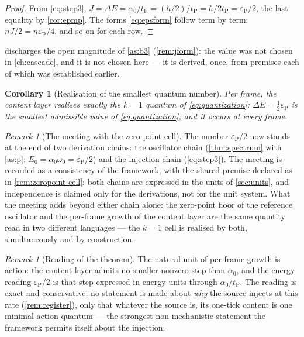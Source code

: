 \documentclass[11pt]{amsbook}
\theoremstyle{plain}
\newtheorem{corollary}[theorem]{Corollary}
\theoremstyle{definition}
\theoremstyle{remark}
\newtheorem{remark}[theorem]{Remark}
\newcommand{\uses}[1]{\par\nopagebreak\noindent{\footnotesize\emph{Uses: #1.}\par}}
\begin{document}
\begin{proof}
From \cref{eq:step3}, $J = \Delta E = \alpha_{0}/t_{\mathrm P} = (\hbar/2)/t_{\mathrm P} = \hbar/2t_{\mathrm P} = \varepsilon_{\mathrm P}/2$, the last equality by \cref{cor:epmp}. The forms \cref{eq:epsform} follow term by term: $nJ/2 = n\varepsilon_{\mathrm P}/4$, and so on for each row.
\end{proof}

 discharges the open magnitude of \cref{as:b3} (\cref{rem:jform}): the value was not chosen in \cref{ch:cascade}, and it is not chosen here --- it is derived, once, from premises each of which was established earlier.

\begin{corollary}[Realisation of the smallest quantum number]\label{cor:quantum-realized}
Per frame, the content layer realises exactly the $k = 1$ quantum of \cref{eq:quantization}: $\Delta E = \tfrac{1}{2}\varepsilon_{\mathrm P}$ is the smallest admissible value of \cref{eq:quantization}, and it occurs at every frame.
\uses{\cref{thm:injection}, \cref{as:a2}}
\end{corollary}

\begin{remark}[The meeting with the zero-point cell]\label{rem:meeting}
The number $\varepsilon_{\mathrm P}/2$ now stands at the end of two derivation chains: the oscillator chain (\cref{thm:spectrum} with \cref{as:p}: $E_{0} = \alpha_{0}\omega_{0} = \varepsilon_{\mathrm P}/2$) and the injection chain (\cref{eq:step3}). The meeting is recorded as a consistency of the framework, with the shared premise declared as in \cref{rem:zeropoint-cell}: both chains are expressed in the units of \cref{sec:units}, and independence is claimed only for the derivations, not for the unit system. What the meeting adds beyond either chain alone: the zero-point floor of the reference oscillator and the per-frame growth of the content layer are the same quantity read in two different languages --- the $k = 1$ cell is realised by both, simultaneously and by construction.
\end{remark}

\begin{remark}[Reading of the theorem]\label{rem:injection-reading}
The natural unit of per-frame growth is action: the content layer admits no smaller nonzero step than $\alpha_{0}$, and the energy reading $\varepsilon_{\mathrm P}/2$ is that step expressed in energy units through $\alpha_{0}/t_{\mathrm P}$. The reading is exact and conservative: no statement is made about \emph{why} the source injects at this rate (\cref{rem:register}), only that whatever the source is, its one-tick content is one minimal action quantum --- the strongest non-mechanistic statement the framework permits itself about the injection.
\end{remark}
\end{document}
